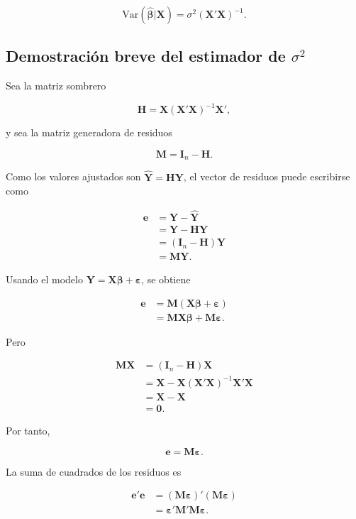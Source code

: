 \documentclass[11pt,a4paper]{article}
\begin{document}
\[
\mathrm{Var}(\hat{\boldsymbol{\beta}}|\mathbf{X}) = \sigma^2 (\mathbf{X}'\mathbf{X})^{-1}.
\]

\subsection*{Demostración breve del estimador de \(\sigma^2\)}

Sea la matriz sombrero

\[
\mathbf{H}=\mathbf{X}(\mathbf{X}'\mathbf{X})^{-1}\mathbf{X}',
\]

y sea la matriz generadora de residuos

\[
\mathbf{M}=\mathbf{I}_n-\mathbf{H}.
\]

Como los valores ajustados son \(\hat{\mathbf{Y}}=\mathbf{H}\mathbf{Y}\), el vector de residuos puede escribirse como

\begin{align*}
\mathbf{e}
&=\mathbf{Y}-\hat{\mathbf{Y}} \\
&=\mathbf{Y}-\mathbf{H}\mathbf{Y} \\
&=(\mathbf{I}_n-\mathbf{H})\mathbf{Y} \\
&=\mathbf{M}\mathbf{Y}.
\end{align*}

Usando el modelo \(\mathbf{Y}=\mathbf{X}\boldsymbol{\beta}+\boldsymbol{\varepsilon}\), se obtiene

\begin{align*}
\mathbf{e}
&=\mathbf{M}(\mathbf{X}\boldsymbol{\beta}+\boldsymbol{\varepsilon}) \\
&=\mathbf{M}\mathbf{X}\boldsymbol{\beta}+\mathbf{M}\boldsymbol{\varepsilon}.
\end{align*}

Pero

\begin{align*}
\mathbf{M}\mathbf{X}
&=(\mathbf{I}_n-\mathbf{H})\mathbf{X} \\
&=\mathbf{X}-\mathbf{X}(\mathbf{X}'\mathbf{X})^{-1}\mathbf{X}'\mathbf{X} \\
&=\mathbf{X}-\mathbf{X} \\
&=\mathbf{0}.
\end{align*}

Por tanto,

\[
\mathbf{e}=\mathbf{M}\boldsymbol{\varepsilon}.
\]

La suma de cuadrados de los residuos es

\begin{align*}
\mathbf{e}'\mathbf{e}
&=(\mathbf{M}\boldsymbol{\varepsilon})'(\mathbf{M}\boldsymbol{\varepsilon}) \\
&=\boldsymbol{\varepsilon}'\mathbf{M}'\mathbf{M}\boldsymbol{\varepsilon}.
\end{align*}
\end{document}
